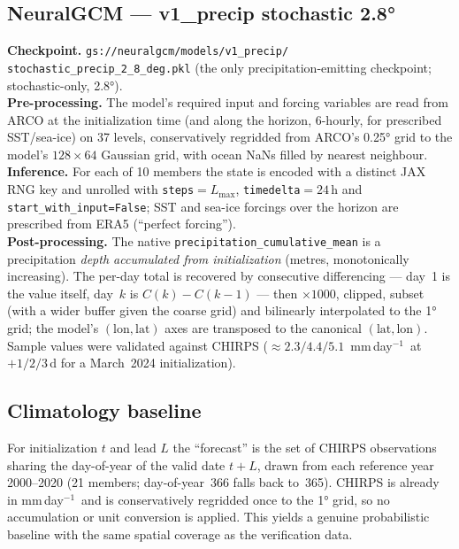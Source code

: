\documentclass[11pt]{article}
\newcommand{\code}[1]{\texttt{\small #1}}
\newcommand{\mmday}{mm\,day$^{-1}$}
\begin{document}
\subsection{NeuralGCM --- v1\_precip stochastic \ang{2.8}}
\textbf{Checkpoint.} \code{gs://neuralgcm/models/v1\_precip/%
stochastic\_precip\_2\_8\_deg.pkl} (the only precipitation-emitting checkpoint;
stochastic-only, \ang{2.8}).\\
\textbf{Pre-processing.} The model's required input and forcing variables are
read from ARCO at the initialization time (and along the horizon, 6-hourly, for
prescribed SST/sea-ice) on 37 levels, conservatively regridded from ARCO's
\ang{0.25} grid to the model's $128\times64$ Gaussian grid, with ocean NaNs
filled by nearest neighbour.\\
\textbf{Inference.} For each of 10 members the state is encoded with a distinct
JAX RNG key and unrolled with \code{steps}${=}L_{\max}$,
\code{timedelta}${=}24$\,h and \code{start\_with\_input=False}; SST and sea-ice
forcings over the horizon are prescribed from ERA5 (``perfect forcing'').\\
\textbf{Post-processing.} The native \code{precipitation\_cumulative\_mean} is a
precipitation \emph{depth accumulated from initialization} (metres,
monotonically increasing). The per-day total is recovered by consecutive
differencing --- day~1 is the value itself, day~$k$ is
$C(k)-C(k-1)$ --- then $\times1000$, clipped, subset (with a wider buffer given
the coarse grid) and bilinearly interpolated to the \ang{1} grid; the model's
$(\text{lon},\text{lat})$ axes are transposed to the canonical
$(\text{lat},\text{lon})$. Sample values were validated against CHIRPS
($\approx 2.3/4.4/5.1$~\mmday\ at $+1/2/3$\,d for a March~2024 initialization).

\subsection{Climatology baseline}
For initialization $t$ and lead $L$ the ``forecast'' is the set of CHIRPS
observations sharing the day-of-year of the valid date $t{+}L$, drawn from each
reference year 2000--2020 (21 members; day-of-year~366 falls back to~365).
CHIRPS is already in \mmday\ and is conservatively regridded once to the \ang{1}
grid, so no accumulation or unit conversion is applied. This yields a genuine
probabilistic baseline with the same spatial coverage as the verification data.
\end{document}
